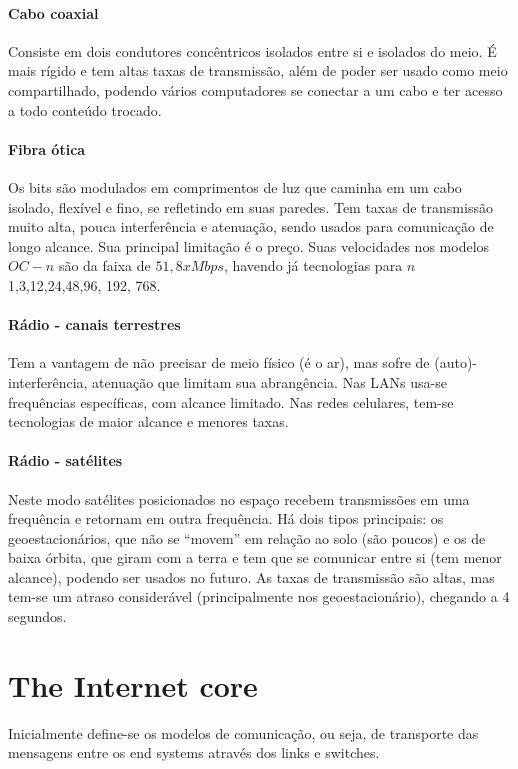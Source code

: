 \paragraph{Cabo coaxial}
Consiste em dois condutores concêntricos isolados entre si e isolados do meio. É mais rígido e tem altas taxas de transmissão, além de poder ser usado como meio compartilhado, podendo vários computadores se conectar a um cabo e ter acesso a todo conteúdo trocado.

\paragraph{Fibra ótica}
Os bits são modulados em comprimentos de luz que caminha em um cabo isolado, flexível e fino, se refletindo em suas paredes.
Tem taxas de transmissão muito alta, pouca interferência e atenuação, sendo usados para comunicação de longo alcance. 
Sua principal limitação é o preço. Suas velocidades nos modelos $OC-n$ são da faixa de $51,8x Mbps$, havendo já tecnologias para $n$ 1,3,12,24,48,96, 192, 768.

\paragraph{Rádio - canais terrestres}
Tem a vantagem de não precisar de meio físico (é o ar), mas sofre de (auto)-interferência, atenuação que limitam sua abrangência. 
Nas LANs usa-se frequências específicas, com alcance limitado. Nas redes celulares, tem-se tecnologias de maior alcance e menores taxas.

\paragraph{Rádio - satélites}
Neste modo satélites posicionados no espaço recebem transmissões em uma frequência e retornam em outra frequência. Há dois tipos principais: os geoestacionários, que não se ``movem'' em relação ao solo (são poucos) e os de baixa órbita, que giram com a terra e tem que se comunicar entre si (tem menor alcance), podendo ser usados no futuro.
As taxas de transmissão são altas, mas tem-se um atraso considerável (principalmente nos geoestacionário), chegando a 4 segundos.

\section{The Internet core}

Inicialmente define-se os modelos de comunicação, ou seja, de transporte das mensagens entre os end systems através dos links e switches.

